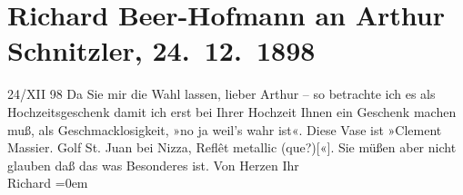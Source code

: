 

         
         \renewcommand{\erwaehntePersonen}{Personen: Clément Massier}
         \renewcommand{\erwaehnteOrte}{Orte: Golfe-Juan, Nizza, Wien}
         \renewcommand{\erwaehnteWerke}{}
               \section[Richard Beer-Hofmann an Arthur Schnitzler, 24. 12. 1898]{ Richard Beer-Hofmann an Arthur Schnitzler, 24. 12. 1898}\nopagebreak{}\rehead{ }\begin{ledgroupsized}[t]{13cm}\normalsize\beginnumbering \toendnotes[C]{\smallbreak\pagebreak[2]} 
\pstart
           \raggedleft{}{\pb}24/XII 98\pend
           \pstart
           Da Sie mir die Wahl lassen, lieber Arthur – so betrachte ich es als Hochzeitsgeschenk
               damit ich erst bei Ihrer Hochzeit Ihnen ein Geschenk machen muß, als
               Geschmacklosigkeit, »no ja weil’s wahr ist«. Diese Vase ist {\pb}»Clement Massier. Golf St. Juan bei Nizza,
               Reflêt metallic (que?){[}«{]}. Sie müßen aber nicht glauben daß das
               was Besonderes ist.\pend
           \pstart
           Von Herzen Ihr{\\[\baselineskip]}\spacefill\mbox{Richard}\pend
           \leftskip=0em{}
         
         \endnumbering{}\end{ledgroupsized}  \newcommand{\dateiname}{L00871}\newcommand{\titel}{Richard Beer-Hofmann an Arthur Schnitzler, 24. 12. 1898}\newcommand{\editorInnen}{Martin Anton Müller und Gerd-Hermann Susen}
      